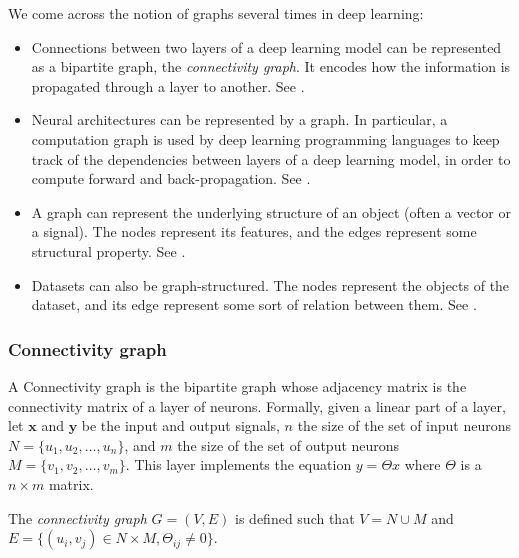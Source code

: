 We come across the notion of graphs several times in deep learning:
\begin{itemize}
\item Connections between two layers of a deep learning model can be represented as a bipartite graph, the \emph{connectivity graph}. It encodes how the information is propagated through a layer to another. See .
\item Neural architectures can be represented by a graph. In particular, a computation graph is used by deep learning programming languages to keep track of the dependencies between layers of a deep learning model, in order to compute forward and back-propagation. See .
\item A graph can represent the underlying structure of an object (often a vector or a signal). The nodes represent its features, and the edges represent some structural property. See .
\item Datasets can also be graph-structured. The nodes represent the objects of the dataset, and its edge represent some sort of relation between them. See .
\end{itemize}


\subsubsection{Connectivity graph}
\label{con_graph}

A Connectivity graph is the bipartite graph whose adjacency matrix is the connectivity matrix of a layer of neurons.
Formally, given a linear part of a layer, let $\textbf{x}$ and $\textbf{y}$ be the input and output signals, $n$ the size of the set of input neurons $N = \{u_1, u_2, \ldots, u_n\}$, and $m$ the size of the set of output neurons $M = \{v_1, v_2, \ldots, v_m\}$. This layer implements the equation $y = \Theta x$ where $\Theta$ is a $n \times m$ matrix.

\begin{definition}
{The \emph{connectivity graph} $G = (V,E)$ is defined such that $V = N \cup M$ and $E = \{(u_i,v_j) \in  N \times M, \Theta_{ij} \neq 0 \} $.}
\end{definition}

